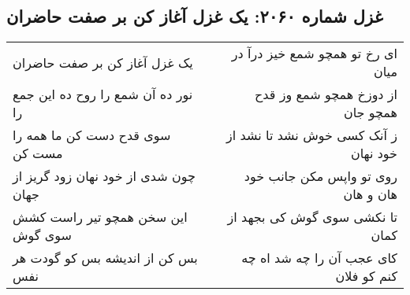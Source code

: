 \begin{center}
\section*{غزل شماره ۲۰۶۰: یک غزل آغاز کن بر صفت حاضران}
\label{sec:2060}
\begin{longtable}{l p{0.5cm} r}
یک غزل آغاز کن بر صفت حاضران
&&
ای رخ تو همچو شمع خیز درآ در میان
\\
نور ده آن شمع را روح ده این جمع را
&&
از دوزخ همچو شمع وز قدح همچو جان
\\
سوی قدح دست کن ما همه را مست کن
&&
ز آنک کسی خوش نشد تا نشد از خود نهان
\\
چون شدی از خود نهان زود گریز از جهان
&&
روی تو واپس مکن جانب خود هان و هان
\\
این سخن همچو تیر راست کشش سوی گوش
&&
تا نکشی سوی گوش کی بجهد از کمان
\\
بس کن از اندیشه بس کو گودت هر نفس
&&
کای عجب آن را چه شد اه چه کنم کو فلان
\\
\end{longtable}
\end{center}
